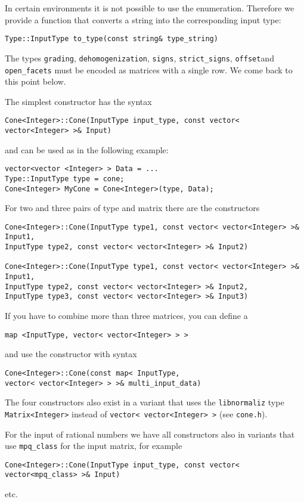 \documentclass[12pt,a4paper]{scrartcl}
\theoremstyle{definition}
\begin{document}
\begin{small}
In certain environments it is not possible to use the enumeration. Therefore we provide a function that converts a string into the corresponding input type:
\begin{Verbatim}
Type::InputType to_type(const string& type_string)
\end{Verbatim}

The types \verb|grading|, \verb|dehomogenization|, \verb|signs|, \verb|strict_signs|, \verb|offset|and \verb|open_facets| must be encoded as matrices with a single row. We come back to this point below.

The simplest constructor has the syntax
\begin{Verbatim}
Cone<Integer>::Cone(InputType input_type, const vector< vector<Integer> >& Input)
\end{Verbatim}
and can be used as in the following example:
\begin{Verbatim}
vector<vector <Integer> > Data = ...
Type::InputType type = cone;
Cone<Integer> MyCone = Cone<Integer>(type, Data);
\end{Verbatim}
For two and three pairs of type and matrix there are the constructors
\begin{Verbatim}
Cone<Integer>::Cone(InputType type1, const vector< vector<Integer> >& Input1,
InputType type2, const vector< vector<Integer> >& Input2)

Cone<Integer>::Cone(InputType type1, const vector< vector<Integer> >& Input1,
InputType type2, const vector< vector<Integer> >& Input2,
InputType type3, const vector< vector<Integer> >& Input3)
\end{Verbatim}

If you have to combine more than three matrices, you can define a
\begin{Verbatim}
map <InputType, vector< vector<Integer> > >
\end{Verbatim}
and use the constructor with syntax
\begin{Verbatim}
Cone<Integer>::Cone(const map< InputType, 
vector< vector<Integer> > >& multi_input_data)
\end{Verbatim}

The four constructors also exist in a variant that uses the \verb|libnormaliz| type \verb|Matrix<Integer>| instead of \verb|vector< vector<Integer> >| (see \verb|cone.h|).

For the input of rational numbers we have all constructors also in variants that use \verb|mpq_class| for the input matrix, for example
\begin{Verbatim}
Cone<Integer>::Cone(InputType input_type, const vector< vector<mpq_class> >& Input)
\end{Verbatim}
etc.


\end{small}
\end{document}
